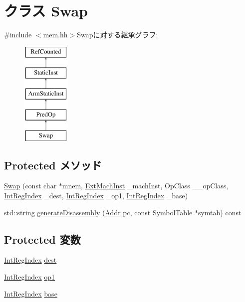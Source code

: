 \hypertarget{classArmISA_1_1Swap}{
\section{クラス Swap}
\label{classArmISA_1_1Swap}
}


{\ttfamily \#include $<$mem.hh$>$}Swapに対する継承グラフ:\begin{figure}[H]
\begin{center}
\leavevmode
\includegraphics[height=5cm]{classArmISA_1_1Swap}
\end{center}
\end{figure}
\subsection*{Protected メソッド}
\begin{DoxyCompactItemize}
\item 
\hyperlink{classArmISA_1_1Swap_ab97bac2c62be7d8b91f18b0ef20c7a63}{Swap} (const char $\ast$mnem, \hyperlink{classStaticInst_a5605d4fc727eae9e595325c90c0ec108}{ExtMachInst} \_\-machInst, OpClass \_\-\_\-opClass, \hyperlink{namespaceArmISA_ae64680ba9fb526106829d6bf92fc791b}{IntRegIndex} \_\-dest, \hyperlink{namespaceArmISA_ae64680ba9fb526106829d6bf92fc791b}{IntRegIndex} \_\-op1, \hyperlink{namespaceArmISA_ae64680ba9fb526106829d6bf92fc791b}{IntRegIndex} \_\-base)
\item 
std::string \hyperlink{classArmISA_1_1Swap_a3134956ec18bb095818e06eb988f6c55}{generateDisassembly} (\hyperlink{classm5_1_1params_1_1Addr}{Addr} pc, const SymbolTable $\ast$symtab) const 
\end{DoxyCompactItemize}
\subsection*{Protected 変数}
\begin{DoxyCompactItemize}
\item 
\hyperlink{namespaceArmISA_ae64680ba9fb526106829d6bf92fc791b}{IntRegIndex} \hyperlink{classArmISA_1_1Swap_aec72e8e45bdc87abeeeb75d2a8a9a716}{dest}
\item 
\hyperlink{namespaceArmISA_ae64680ba9fb526106829d6bf92fc791b}{IntRegIndex} \hyperlink{classArmISA_1_1Swap_a4c465c43ad568f8bcf8ae71480e9cfea}{op1}
\item 
\hyperlink{namespaceArmISA_ae64680ba9fb526106829d6bf92fc791b}{IntRegIndex} \hyperlink{classArmISA_1_1Swap_ad7a926fdfe0820284d654e9139a423b2}{base}
\end{DoxyCompactItemize}


